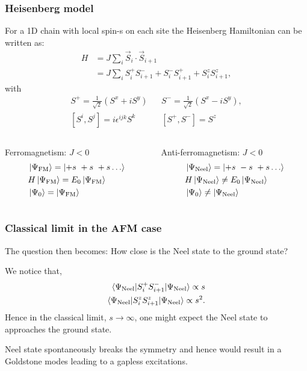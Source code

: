 \documentclass{beamer}
\begin{document}
\begin{frame}
    \frametitle{Heisenberg model}
    For a 1D chain with local spin-s on each site the Heisenberg Hamiltonian can be written as:
    \begin{align*}
        H &= J \sum_i \vec{S}_{i} \cdot \vec{S}_{i+1} \nonumber \\
          &= J \sum_i S^+_i S^-_{i+1} + S^-_i S^+_{i+1} + S^z_i S^z_{i+1}, 
    \end{align*}
    with 
    \begin{align*}
        S^+ = \frac{1}{\sqrt{2}} \left(S^x + i S^y \right) && S^- = \frac{1}{\sqrt{2}} \left(S^x - i S^y \right), \nonumber \\
        [ S^i, S^j  ] = i \epsilon^{ijk} S^k && [ S^+, S^-] = S^z
    \end{align*} 
    \pause
    \begin{columns}
    \begin{column}{0.5\textwidth}
        Ferromagnetism: 
        $J<0$ 
        \begin{align*}
            &\ket{\Psi_{\text{FM}}} = \ket{ +s\ +s\ +s\dots} \nonumber \\ 
            &H \ket{\Psi_{\text{FM}}} = E_0 \ket{\Psi_{\text{FM}}} \nonumber \\ 
            &\ket{\Psi_0} = \ket{\Psi_{\text{FM}}} 
        \end{align*}
    \end{column}\pause
    \begin{column}{0.5\textwidth}
        Anti-ferromagnetism: 
        $J<0$ 
        \begin{align*}
            &\ket{\Psi_{\text{Neel}}} = \ket{ +s\ -s\ +s\dots} \nonumber \\ 
            &H \ket{\Psi_{\text{Neel}}} \neq E_0 \ket{\Psi_{\text{Neel}}} \nonumber \\ 
            &\ket{\Psi_0} \neq \ket{\Psi_{\text{Neel}}} 
        \end{align*}
    \end{column}
    \end{columns}

\end{frame}


\begin{frame}
    \frametitle{Classical limit in the AFM case}
    The question then becomes: How close is the Neel state to the ground state?\pause

    We notice that, 
    \begin{align*}
        \braket{\Psi_{\text{Neel}}| S^+_i S^-_{i+1} | \Psi_{\text{Neel}}} \propto s \\
        \braket{\Psi_{\text{Neel}}| S^z_i S^z_{i+1} | \Psi_{\text{Neel}}} \propto s^2.
    \end{align*}
    Hence in the classical limit, $s \rightarrow \infty$, one might expect the Neel state to approaches the ground state. \pause 

    Neel state spontaneously breaks the symmetry and hence would result in a Goldstone modes leading to a gapless excitations. 

\end{frame}
\end{document}
